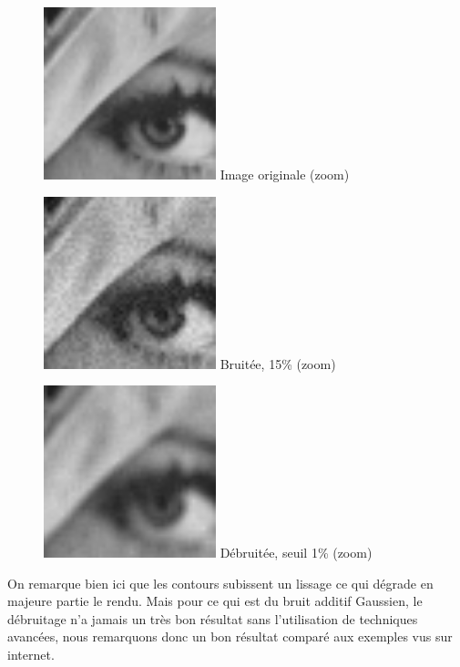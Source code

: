 \documentclass{article}
\begin{document}
		\begin{figure}[!ht]
			\centering
			\begin{minipage}[t]{5cm}
				\centering
				\includegraphics[width=5cm,height=5cm]{lenaZOOM.jpg}
				Image originale (zoom)
			\end{minipage}
			\begin{minipage}[t]{5cm}
				\centering
				\includegraphics[width=5cm,height=5cm]{Gaussian/noisy_15_ZOOM.jpg}
				Bruitée, 15\% (zoom)
			\end{minipage}
			\begin{minipage}[t]{5cm}
				\centering
				\includegraphics[width=5cm,height=5cm]{Gaussian/algo_1_ZOOM.jpg}
				Débruitée, seuil 1\% (zoom)
			\end{minipage} 
		\end{figure}
		On remarque bien ici que les contours subissent un lissage ce qui dégrade en majeure partie le rendu. Mais pour ce qui est du bruit additif Gaussien, le débruitage n'a jamais un très bon résultat sans l'utilisation de techniques avancées, nous remarquons donc un bon résultat comparé aux exemples vus sur internet.
\end{document}
